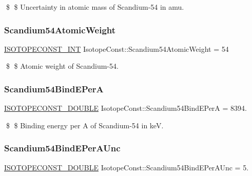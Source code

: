 \$ \$ Uncertainty in atomic mass of Scandium-\/54 in amu. \mbox{\label{group___isotope_const-_scandium-_sc54_gaf5398eb4ce225112a89ce9b20d95b5d7}} 
\subsubsection{\texorpdfstring{Scandium54\+Atomic\+Weight}{Scandium54AtomicWeight}}
{\footnotesize\ttfamily \mbox{\hyperlink{group___isotope_const-_macros_ga5f18360b3e99483a35c32d789e62621c}{I\+S\+O\+T\+O\+P\+E\+C\+O\+N\+S\+T\+\_\+\+I\+NT}} Isotope\+Const\+::\+Scandium54\+Atomic\+Weight = 54}

\$ \$ Atomic weight of Scandium-\/54. \mbox{\label{group___isotope_const-_scandium-_sc54_ga2baf5a38db2f464b1797493ad100ea07}} 
\subsubsection{\texorpdfstring{Scandium54\+Bind\+E\+PerA}{Scandium54BindEPerA}}
{\footnotesize\ttfamily \mbox{\hyperlink{group___isotope_const-_macros_ga8f45a7272ce02c0b4c65c44636ed719a}{I\+S\+O\+T\+O\+P\+E\+C\+O\+N\+S\+T\+\_\+\+D\+O\+U\+B\+LE}} Isotope\+Const\+::\+Scandium54\+Bind\+E\+PerA = 8394.}

\$ \$ Binding energy per A of Scandium-\/54 in keV. \mbox{\label{group___isotope_const-_scandium-_sc54_ga947a58ca4e00928a23f786814c67267c}} 
\subsubsection{\texorpdfstring{Scandium54\+Bind\+E\+Per\+A\+Unc}{Scandium54BindEPerAUnc}}
{\footnotesize\ttfamily \mbox{\hyperlink{group___isotope_const-_macros_ga8f45a7272ce02c0b4c65c44636ed719a}{I\+S\+O\+T\+O\+P\+E\+C\+O\+N\+S\+T\+\_\+\+D\+O\+U\+B\+LE}} Isotope\+Const\+::\+Scandium54\+Bind\+E\+Per\+A\+Unc = 5.}

